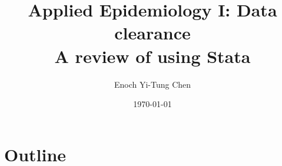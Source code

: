 

\title[Applied Epi I: Data Management]{Applied Epidemiology I: Data clearance\\ A review of using Stata}
\date{\today}
\author[Enoch Yi-Tung Chen]{Enoch Yi-Tung Chen}




\begin{frame}
\maketitle 
\end{frame}



\section*{Outline}
\begin{frame}{\secname}
 \begin{columns}[t]
        \begin{column}{.5\textwidth}
            \tableofcontents[sections={1-4}]
        \end{column}
        \begin{column}{.5\textwidth}
            \tableofcontents[sections={5-7}]
        \end{column}
\end{columns}
\end{frame}


